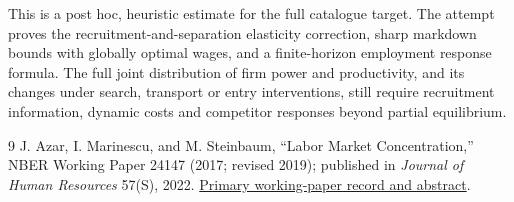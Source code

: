 \documentclass[11pt]{article}
\theoremstyle{definition}
\begin{document}
This is a post hoc, heuristic estimate for the full catalogue target.
The attempt proves the recruitment-and-separation elasticity correction, sharp markdown bounds with globally optimal wages, and a finite-horizon employment response formula. The full joint distribution of firm power and productivity, and its changes under search, transport or entry interventions, still require recruitment information, dynamic costs and competitor responses beyond partial equilibrium.

\begin{thebibliography}{9}
 J. Azar, I. Marinescu, and M. Steinbaum, ``Labor Market Concentration,'' NBER Working Paper 24147 (2017; revised 2019); published in \emph{Journal of Human Resources} 57(S), 2022. \href{https://www.nber.org/papers/w24147}{Primary working-paper record and abstract}.
\end{thebibliography}
\end{document}

